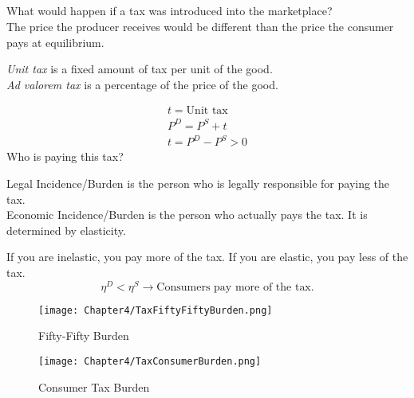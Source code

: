 \subsection{}
What would happen if a tax was introduced into the marketplace?\\
The price the producer receives would be different than the price the consumer pays at equilibrium.\\
\begin{definition}
    \emph{Unit tax} is a fixed amount of tax per unit of the good.\\
    \emph{Ad valorem tax} is a percentage of the price of the good.\\
\end{definition}
\begin{gather}
    t = \text{Unit tax}\\
    P^D = P^S + t\\
    t = P^D - P^S > 0
\end{gather}
Who is paying this tax?\\
\begin{definition}
    {Legal Incidence/Burden} is the person who is legally responsible for paying the tax.\\
    {Economic Incidence/Burden} is the person who actually pays the tax. It is determined by elasticity.\\
\end{definition}
If you are inelastic, you pay more of the tax. If you are elastic, you pay less of the tax.\\
\begin{equation}
    \eta^D < \eta^S \rightarrow \text{Consumers pay more of the tax.}
\end{equation}
\begin{figure}[H]
    \centering
    \texttt{[image: Chapter4/TaxFiftyFiftyBurden.png]}
    \caption{Fifty-Fifty Burden}
\end{figure}
\begin{figure}[H]
    \centering
    \texttt{[image: Chapter4/TaxConsumerBurden.png]}
    \caption{Consumer Tax Burden}
\end{figure}